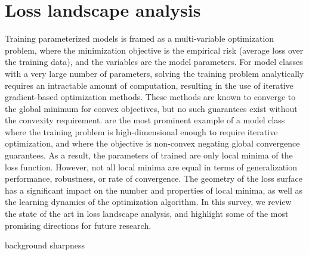 \chapter{Loss landscape analysis}\label{chap:lla}

Training parameterized  models
is framed as a multi-variable optimization problem,
where the minimization objective is the empirical risk (average loss over the training data),
and the variables are the model parameters.
For model classes with a very large number of parameters,
solving the training problem analytically requires an intractable amount of computation,
resulting in the use of iterative gradient-based optimization methods.
These methods are known to converge to the global minimum for convex objectives,
but no such guarantees exist without the convexity requirement.
 are the most prominent example of a model class
where the training problem is high-dimensional enough to require iterative optimization,
and where the objective is non-convex negating global convergence guarantees.
As a result, the parameters of trained 
are only local minima of the loss function.
However, not all local minima are equal in terms of generalization performance,
robustness, or rate of convergence.
The geometry of the loss surface has a significant impact
on the number and properties of local minima,
as well as the learning dynamics of the optimization algorithm.
In this survey, we review the state of the art in loss landscape analysis,
and highlight some of the most promising directions for future research.

{background}
{sharpness}
